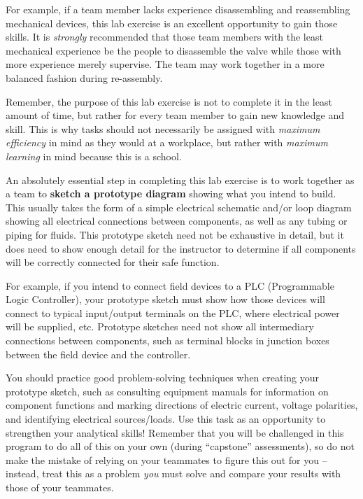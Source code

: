 For example, if a team member lacks experience disassembling and reassembling mechanical devices, this lab exercise is an excellent opportunity to gain those skills.  It is {\it strongly} recommended that those team members with the least mechanical experience be the people to disassemble the valve while those with more experience merely supervise.  The team may work together in a more balanced fashion during re-assembly.  

Remember, the purpose of this lab exercise is not to complete it in the least amount of time, but rather for every team member to gain new knowledge and skill.  This is why tasks should not necessarily be assigned with {\it maximum efficiency} in mind as they would at a workplace, but rather with {\it maximum learning} in mind because this is a school.

\vskip 10pt

An absolutely essential step in completing this lab exercise is to work together as a team to {\bf sketch a prototype diagram} showing what you intend to build.  This usually takes the form of a simple electrical schematic and/or loop diagram showing all electrical connections between components, as well as any tubing or piping for fluids.  This prototype sketch need not be exhaustive in detail, but it does need to show enough detail for the instructor to determine if all components will be correctly connected for their safe function.

For example, if you intend to connect field devices to a PLC (Programmable Logic Controller), your prototype sketch must show how those devices will connect to typical input/output terminals on the PLC, where electrical power will be supplied, etc.  Prototype sketches need not show all intermediary connections between components, such as terminal blocks in junction boxes between the field device and the controller.

You should practice good problem-solving techniques when creating your prototype sketch, such as consulting equipment manuals for information on component functions and marking directions of electric current, voltage polarities, and identifying electrical sources/loads.  Use this task as an opportunity to strengthen your analytical skills!  Remember that you will be challenged in this program to do all of this on your own (during ``capstone'' assessments), so do not make the mistake of relying on your teammates to figure this out for you -- instead, treat this as a problem {\it you} must solve and compare your results with those of your teammates.


